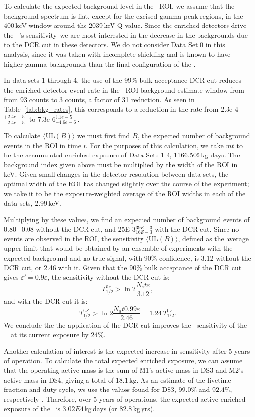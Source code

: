 To calculate the expected background level in the \nonubb\ ROI, we assume that the background spectrum is flat, except for the excised gamma peak regions, in the 400\,keV window around the 2039\,keV Q-value. Since the enriched detectors drive the \MJ\ \DEM 's sensitivity, we are most interested in the decrease in the backgrounds due to the DCR cut in these detectors. We do not consider Data Set 0 in this analysis, since it was taken with incomplete shielding and is known to have higher gamma backgrounds than the final configuration of the \DEM. 

In data sets 1 through 4, the use of the 99\% bulk-acceptance DCR cut reduces the enriched detector event rate in the \nonubb\ ROI background-estimate window from from 93 counts to 3 counts, a factor of 31 reduction. As seen in Table~\ref{tab:bkg_rates}, this corresponds to a reduction in the rate from 2.3e-4$^{+ 2.4e-5}_{-2.4e-5}$\,\cpKkgd\ to 7.3e-6$^{1.1e-5}_{-4.6e-6}$\,\cpKkgd . 

To calculate $\langle$UL$(B)\rangle$ we must first find $B$, the expected number of background events in the ROI in time $t$. For the purposes of this calculation, we take $mt$ to be the accumulated enriched exposure of Data Sets 1-4, 1166.505\,kg days. The background index given above must be multiplied by the width of the ROI in keV. Given small changes in the detector resolution between data sets, the optimal width of the ROI has changed slightly over the course of the experiment; we take it to be the exposure-weighted average of the ROI widths in each of the data sets, 2.99\,keV. 

Multiplying by these values, we find an expected number of background events of 0.80$\pm$0.08 without the DCR cut, and 25E-3$^{39E-3}_{16E-3}$ with the DCR cut. Since no events are observed in the ROI, the sensitivity $\langle$UL$(B)\rangle$, defined as the average upper limit that would be obtained by an ensemble of experiments with the expected background and no true signal, with 90\% confidence, is 3.12 without the DCR cut, or 2.46 with it. Given that the 90\% bulk acceptance of the DCR cut gives $\varepsilon \prime = 0.9\varepsilon$, the sensitivity without the DCR cut is:
$$T^{0\nu}_{1/2} >  \ln 2 \frac{N_a t \varepsilon }{3.12},$$
and with the DCR cut it is:
$$T^{0\nu \prime}_{1/2}  >  \ln 2 \frac{N_a t 0.99\varepsilon }{2.46} = 1.24\,T^{0\nu}_{1/2}. $$
We conclude the the application of the DCR cut improves the \nonubb\ sensitivity of the \MJ\ \DEM\ at its current exposure by 24\%. 

Another calculation of interest is the expected increase in sensitivity after 5 years of operation. To calculate the total expected enriched exposure, we can assume that the operating active mass is the sum of M1's active mass in DS3 and M2's active mass in DS4, giving a total of 18.1\,kg. As an estimate of the livetime fraction and duty cycle, we use the values found for DS3, 99.0\% and 92.4\%, respectively \cite{Livetime_unidoc} \cite{RunSel_DS3_unidoc}. Therefore, over 5 years of operations, the expected active enriched exposure of the \DEM\ is $3.02E4$\,kg\,days (or 82.8\,kg\,yrs). 

